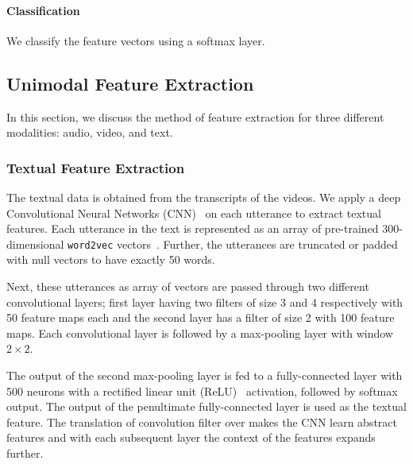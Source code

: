 \documentclass[review]{elsarticle}
\newcommand\?[1]{\hl{#1}}
\begin{document}
\paragraph{Classification}
We classify the feature vectors using a softmax layer.


\subsection{Unimodal Feature Extraction}
\label{UFE}

In this section, we discuss the method of feature extraction for three different
modalities: audio, video, and text.

\subsubsection{Textual Feature Extraction}
\label{text}

The textual data is obtained from the transcripts of the videos. We apply a deep
Convolutional Neural Networks (CNN)~\citep{karpathy2014large} on each utterance
to extract textual features. Each utterance in the text is represented as an
array of pre-trained 300-dimensional {\tt word2vec}
vectors~\citep{mikolov2013efficient}. Further, the utterances are truncated or
padded with null vectors to have exactly 50 words.

Next, these utterances as array of vectors are passed through two different
convolutional layers; first layer having two filters of size 3 and 4
respectively with 50 feature maps each and the second layer has a filter of size
2 with 100 feature maps. Each convolutional layer is followed by a max-pooling
layer with window $2\times 2$.

The output of the second max-pooling layer is fed to a fully-connected layer
with 500 neurons with a rectified linear unit (ReLU)~\citep{whyeteh2001rate}
activation, followed by softmax output. The output of the penultimate
fully-connected layer is used as the textual feature. The translation of
convolution filter over makes the CNN learn abstract features and with each
subsequent layer the context of the features expands further.

\end{document}
